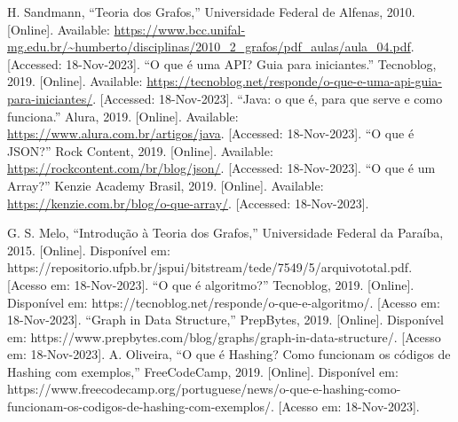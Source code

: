  H. Sandmann, ``Teoria dos Grafos,'' Universidade Federal de Alfenas, 2010. [Online]. Available: \url{https://www.bcc.unifal-mg.edu.br/~humberto/disciplinas/2010_2_grafos/pdf_aulas/aula_04.pdf}. [Accessed: 18-Nov-2023].
 ``O que é uma API? Guia para iniciantes.'' Tecnoblog, 2019. [Online]. Available: \url{https://tecnoblog.net/responde/o-que-e-uma-api-guia-para-iniciantes/}. [Accessed: 18-Nov-2023].
 ``Java: o que é, para que serve e como funciona.'' Alura, 2019. [Online]. Available: \url{https://www.alura.com.br/artigos/java}. [Accessed: 18-Nov-2023].
 ``O que é JSON?'' Rock Content, 2019. [Online]. Available: \url{https://rockcontent.com/br/blog/json/}. [Accessed: 18-Nov-2023].
 ``O que é um Array?'' Kenzie Academy Brasil, 2019. [Online]. Available: \url{https://kenzie.com.br/blog/o-que-array/}. [Accessed: 18-Nov-2023].






 G. S. Melo, ``Introdução à Teoria dos Grafos,'' Universidade Federal da Paraíba, 2015. [Online]. Disponível em: https://repositorio.ufpb.br/jspui/bitstream/tede/7549/5/arquivototal.pdf. [Acesso em: 18-Nov-2023].
 ``O que é algoritmo?'' Tecnoblog, 2019. [Online]. Disponível em: https://tecnoblog.net/responde/o-que-e-algoritmo/. [Acesso em: 18-Nov-2023].
 ``Graph in Data Structure,'' PrepBytes, 2019. [Online]. Disponível em: https://www.prepbytes.com/blog/graphs/graph-in-data-structure/. [Acesso em: 18-Nov-2023].
 A. Oliveira, ``O que é Hashing? Como funcionam os códigos de Hashing com exemplos,'' FreeCodeCamp, 2019. [Online]. Disponível em: https://www.freecodecamp.org/portuguese/news/o-que-e-hashing-como-funcionam-os-codigos-de-hashing-com-exemplos/. [Acesso em: 18-Nov-2023].



